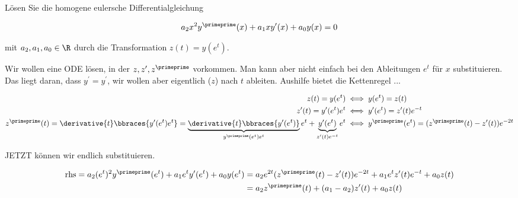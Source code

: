 
\begin{exercise}

Lösen Sie die homogene eulersche Differentialgleichung

\begin{align*}
    a_2 x^2 y^\primeprime(x) + a_1 x y^\prime(x) + a_0 y(x) = 0
\end{align*}

mit $a_2, a_1, a_0 \in \R$ durch die Transformation $z(t) = y(e^t)$.

\end{exercise}


\begin{solution}

Wir wollen eine ODE lösen, in der $z, z^\prime, z^\primeprime$ vorkommen.
Man kann aber nicht einfach bei den Ableitungen $e^t$ für $x$ substituieren.
Das liegt daran, dass $y^\prime = y^\prime$, wir wollen aber eigentlich ($z$) nach $t$ ableiten.
Aushilfe bietet die Kettenregel ...

\begin{align*}
    z(t)
    =
    y(e^t)
    & \iff
    y(e^t)
    =
    z(t) \\
    z^\prime(t)
    =
    y^\prime(e^t) e^t
    & \iff
    y^\prime(e^t)
    =
    z^\prime(t) e^{-t} \\
    z^\primeprime(t)
    =
    \derivative{t}
    \bbraces
    {
        y^\prime(e^t) e^t
    }
    =
    \underbrace
    {
        \derivative{t}
        \bbraces
        {
            y^\prime(e^t)
        }
    }_{
        y^\primeprime(e^t) e^t
    }
    e^t
    +
    \underbrace
    {
        y^\prime(e^t)
    }_{
        z^\prime(t) e^{-t}
    }
    e^t
    & \iff
    y^\primeprime(e^t)
    =
    (
        z^\primeprime(t)
        -
        z^\prime(t)
    )
    e^{-2t}
\end{align*}

JETZT können wir endlich substituieren.

\begin{align*}
    \text{rhs}
    =
    a_2 (e^t)^2 y^\primeprime(e^t)
    +
    a_1 e^t y^\prime(e^t)
    +
    a_0 y(e^t)
    & =
    a_2 e^{2t}
    (
        z^\primeprime(t)
        -
        z^\prime(t)
    )
    e^{-2t}
    +
    a_1 e^t
    z^\prime(t)
    e^{-t}
    +
    a_0
    z(t) \\
    & =
    a_2 z^\primeprime(t) + (a_1 - a_2) z^\prime(t) + a_0 z(t)
\end{align*}


\end{solution}
